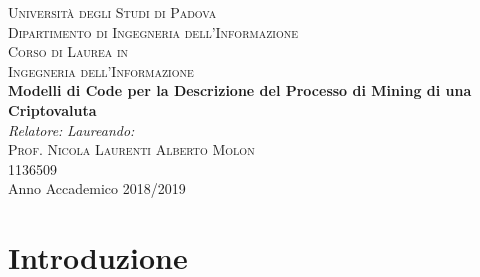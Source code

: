 \begin{titlepage}
\begin{center}
\vspace{0.8cm}
\textsc{\LARGE Universit\`{a} degli Studi di Padova}\\
\vspace{0.45cm}
\textsc{\large Dipartimento di Ingegneria dell'Informazione}\\
\vspace{0.4cm}
\textsc{\large Corso di Laurea in}\\
\textsc{\large Ingegneria dell'Informazione}\\
\vfill
{ \LARGE \bfseries Modelli di Code per la Descrizione del Processo di Mining di una Criptovaluta}\\
\vfill
\textit{\large Relatore:} \hfill \textit{\large Laureando:}\\
\textsc{\large Prof. Nicola Laurenti} \hfill \textsc{\large{Alberto Molon}}\\
\hfill \textsc{1136509}\\

\vfill
{\large Anno Accademico 2018/2019} %
\end{center}
\end{titlepage}

\thispagestyle{empty} %
\cleardoublepage

\thispagestyle{empty}

\clearpage{\pagestyle{plain}\cleardoublepage}


\clearpage{\pagestyle{plain}\cleardoublepage}
\setlength{\cftbeforetoctitleskip}{-0.5em}
\large \tableofcontents %

\clearpage{\pagestyle{plain}\cleardoublepage} %

\clearpage{\pagestyle{plain}\cleardoublepage} %
\chapter{Introduzione} %
\label{cap:introduzione} %

